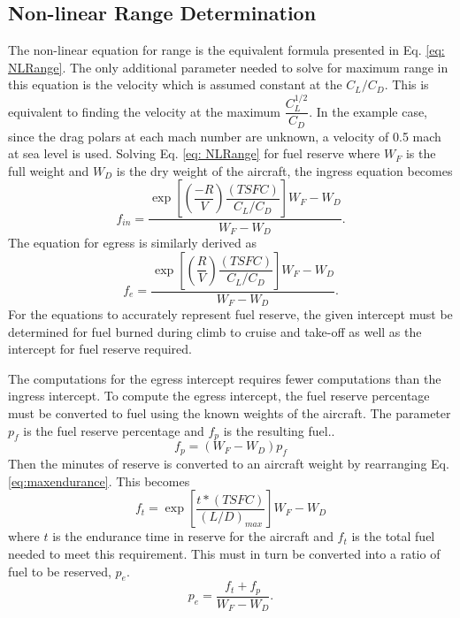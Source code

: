 \subsection*{Non-linear Range Determination}
The non-linear equation for range is the equivalent formula presented in Eq. \ref{eq: NLRange}. The only additional parameter needed to solve for maximum range in this equation is the velocity which is assumed constant at the $C_L/C_D$. This is equivalent to finding the velocity at the maximum $\dfrac{C_L^{1/2}}{C_D}$. In the example case, since the drag polars at each mach number are unknown, a velocity of 0.5 mach at sea level is used. Solving Eq. \ref{eq: NLRange} for fuel reserve where $W_F$ is the full weight and $W_D$ is the dry weight of the aircraft, the ingress equation becomes
\begin{equation}
    f_{in} = \dfrac{\exp\left[\left(\dfrac{-R}{V}\right)\dfrac{(TSFC)}{C_L/C_D}\right]W_F-W_D}{W_F - W_D}.
    \label{eq: NLEgressEq}
\end{equation}
The equation for egress is similarly derived as 
\begin{equation}
    f_{e} =\dfrac{\exp\left[\left(\dfrac{R}{V}\right)\dfrac{(TSFC)}{C_L/C_D}\right]W_F-W_D}{W_F - W_D}.
    \label{eq: NLIngressEq}
\end{equation}
For the equations to accurately represent fuel reserve, the given intercept must be determined for fuel burned during climb to cruise and take-off as well as the intercept for fuel reserve required.\par
The computations for the egress intercept requires fewer computations than the ingress intercept. To compute the egress intercept, the fuel reserve percentage must be converted to fuel using the known weights of the aircraft. The parameter $p_f$ is the fuel reserve percentage and $f_p$ is the resulting fuel..
\begin{equation}
    f_p = (W_F - W_D)p_f
\end{equation}
Then the minutes of reserve is converted to an aircraft weight by rearranging Eq. \ref{eq:maxendurance}. This becomes
\begin{equation}
    f_t = \exp\left[\dfrac{t*(TSFC)}{(L/D)_{max}}\right]W_F-W_D
\end{equation}
where $t$ is the endurance time in reserve for the aircraft and $f_t$ is the total fuel needed to meet this requirement. This must in turn be converted into a ratio of fuel to be reserved, $p_e$.
\begin{equation}
    p_e = \dfrac{f_t + f_p}{W_F-W_D}.
\end{equation}
